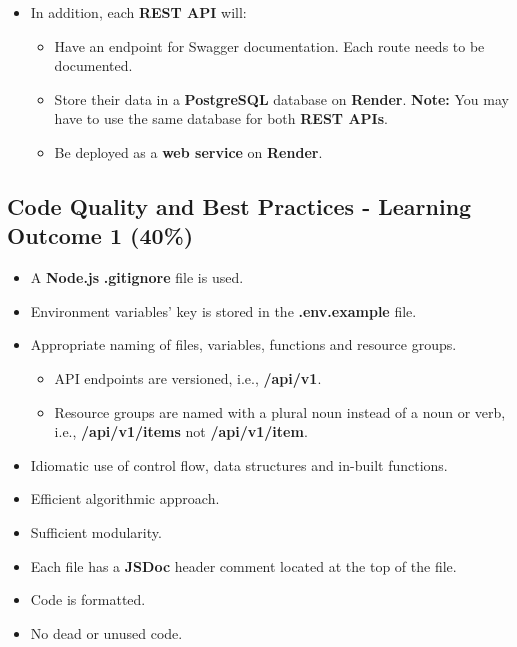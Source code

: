 \documentclass{article}
\begin{document}
\begin{itemize}
\begin{itemize}
	\end{itemize}
	\item In addition, each \textbf{REST API} will:
	\begin{itemize}
		\item Have an endpoint for Swagger documentation. Each route needs to be documented. 
		\item Store their data in a \textbf{PostgreSQL} database on \textbf{Render}. \textbf{Note:} You may have to use the same database for both \textbf{REST APIs}.
		\item Be deployed as a \textbf{web service} on \textbf{Render}.
	\end{itemize} 
\end{itemize}

\subsection*{Code Quality and Best Practices - Learning Outcome 1 (40\%)}
\begin{itemize}
	\item A \textbf{Node.js} \textbf{.gitignore} file is used.
	\item Environment variables' key is stored in the \textbf{.env.example} file. 
  	\item Appropriate naming of files, variables, functions and resource groups.
  	\begin{itemize}
		\item API endpoints are versioned, i.e., \textbf{/api/v1}.
		\item Resource groups are named with a plural noun instead of a noun or verb, i.e., \textbf{/api/v1/items} not \textbf{/api/v1/item}.
  	\end{itemize}
	\item Idiomatic use of control flow, data structures and in-built functions.
	\item Efficient algorithmic approach.
	\item Sufficient modularity.
	\item Each file has a \textbf{JSDoc} header comment located at the top of the file.
	\item Code is formatted.
	\item No dead or unused code. 
\end{itemize}
\end{document}
